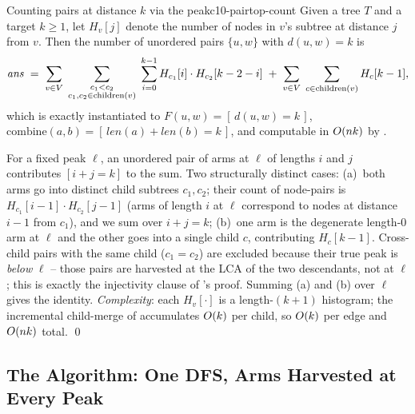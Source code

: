\begin{theorem}{Counting pairs at distance $k$ via the peak}{c10-pairtop-count}
Given a tree $T$ and a target $k\ge 1$, let $H_v[j]$ denote the number of
nodes in $v$'s subtree at distance $j$ from $v$. Then the number of
unordered pairs $\{u,w\}$ with $d(u,w)=k$ is
\[
  \mathit{ans} \;=\; \sum_{v\in V}\;\sum_{\substack{c_1<c_2\\\mathstrut c_1,c_2\in\operatorname{children}(v)}}\;\sum_{i=0}^{k-1} H_{c_1}[i]\cdot H_{c_2}[k-2-i]
  \;+\;\sum_{v\in V}\;\sum_{c\in\operatorname{children}(v)} H_c[k-1],
\]
which is exactly  instantiated to
$F(u,w)=[\,d(u,w)=k\,]$, $\mathrm{combine}(a,b) = [\,\mathit{len}(a)+\mathit{len}(b)=k\,]$,
and computable in $O(nk)$ by .
\end{theorem}
\begin{proofbox}
For a fixed peak $\ell$, an unordered pair of arms at $\ell$ of lengths
$i$ and $j$ contributes $[i+j=k]$ to the sum. Two structurally distinct
cases: (a)~both arms go into distinct child subtrees $c_1, c_2$; their
count of node-pairs is $H_{c_1}[i-1]\cdot H_{c_2}[j-1]$ (arms of length $i$
at $\ell$ correspond to nodes at distance $i-1$ from $c_1$), and we sum
over $i+j=k$; (b)~one arm is the degenerate length-$0$ arm at $\ell$ and
the other goes into a single child $c$, contributing $H_c[k-1]$. Cross-child
pairs with the same child ($c_1=c_2$) are excluded because their true peak
is \emph{below} $\ell$ -- those pairs are harvested at the LCA of the two
descendants, not at $\ell$; this is exactly the injectivity clause of
's proof. Summing (a) and (b) over $\ell$ gives the
identity. \emph{Complexity}: each $H_v[\cdot]$ is a length-$(k+1)$
histogram; the incremental child-merge of  accumulates
$O(k)$ per child, so $O(k)$ per edge and $O(nk)$ total. \qed
\end{proofbox}

\subsection{The Algorithm: One DFS, Arms Harvested at Every Peak}

